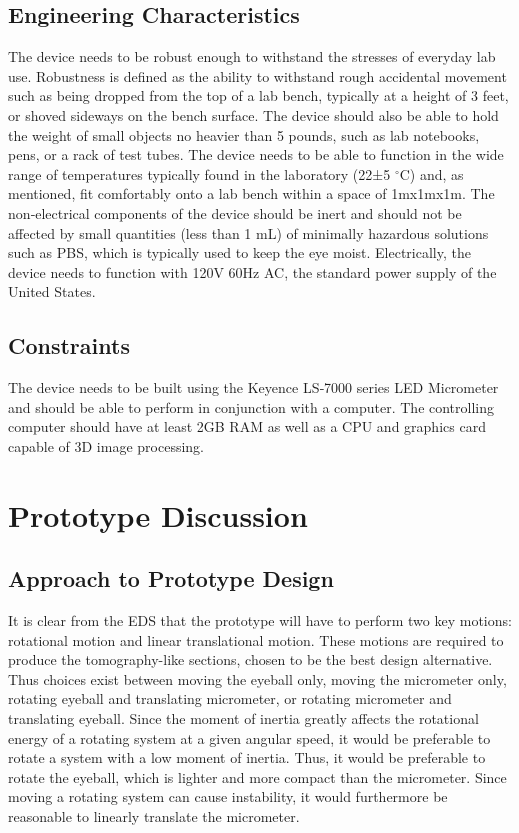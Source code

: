 \documentclass{article}
\begin{document}
\subsection{Engineering Characteristics}
The device needs to be robust enough to withstand the stresses of everyday lab use. Robustness is defined as the ability to withstand rough accidental movement such as being dropped from the top of a lab bench, typically at a height of 3 feet, or shoved sideways on the bench surface. The device should also be able to hold the weight of small objects no heavier than 5 pounds, such as lab notebooks, pens, or a rack of test tubes. The device needs to be able to function in the wide range of temperatures typically found in the laboratory (22±5 $^\circ$C) and, as mentioned, fit comfortably onto a lab bench within a space of 1mx1mx1m. The non‐electrical components of the device should be inert and should not be affected by small quantities (less than 1 mL) of minimally hazardous solutions such as PBS\cite{users_manual}, which is typically used to keep the eye moist. Electrically, the device needs to function with 120V 60Hz AC, the standard power supply of the United States.

\subsection{Constraints}
The device needs to be built using the Keyence LS‐7000 series LED Micrometer and should be able to perform in conjunction with a computer. The controlling computer should have at least 2GB RAM as well as a CPU and graphics card capable of 3D image processing.


\section{Prototype Discussion}
\subsection{Approach to Prototype Design}
It is clear from the EDS that the prototype will have to perform two key motions: rotational motion and linear translational motion. These motions are required to produce the tomography-like sections, chosen to be the best design alternative. Thus choices exist between moving the eyeball only, moving the micrometer only, rotating eyeball and translating micrometer, or rotating micrometer and translating eyeball. Since the moment of inertia greatly affects the rotational energy of a rotating system at a given angular speed, it would be preferable to rotate a system with a low moment of inertia. Thus, it would be preferable to rotate the eyeball, which is lighter and more compact than the micrometer. Since moving a rotating system can cause instability, it would furthermore be reasonable to linearly translate the micrometer. 
\end{document}
